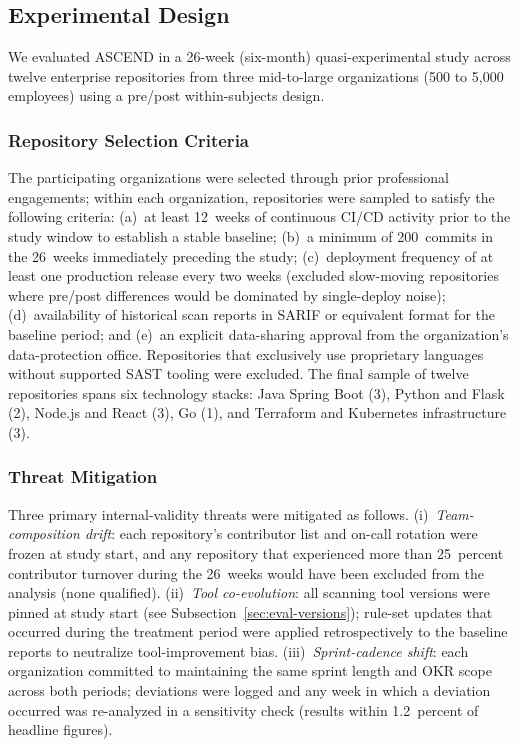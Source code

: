 \documentclass{ieeeaccess}
\begin{document}
\subsection{Experimental Design}
We evaluated ASCEND in a 26-week (six-month) quasi-experimental study across twelve enterprise repositories from three mid-to-large organizations (500 to 5{,}000 employees) using a pre/post within-subjects design.

\subsubsection{Repository Selection Criteria}
The participating organizations were selected through prior professional engagements; within each organization, repositories were sampled to satisfy the following criteria: (a)~at least 12~weeks of continuous CI/CD activity prior to the study window to establish a stable baseline; (b)~a minimum of 200~commits in the 26~weeks immediately preceding the study; (c)~deployment frequency of at least one production release every two weeks (excluded slow-moving repositories where pre/post differences would be dominated by single-deploy noise); (d)~availability of historical scan reports in SARIF or equivalent format for the baseline period; and (e)~an explicit data-sharing approval from the organization's data-protection office. Repositories that exclusively use proprietary languages without supported SAST tooling were excluded. The final sample of twelve repositories spans six technology stacks: Java Spring Boot (3), Python and Flask (2), Node.js and React (3), Go (1), and Terraform and Kubernetes infrastructure (3).

\subsubsection{Threat Mitigation}
Three primary internal-validity threats were mitigated as follows. (i)~\textit{Team-composition drift}: each repository's contributor list and on-call rotation were frozen at study start, and any repository that experienced more than 25~percent contributor turnover during the 26~weeks would have been excluded from the analysis (none qualified). (ii)~\textit{Tool co-evolution}: all scanning tool versions were pinned at study start (see Subsection~\ref{sec:eval-versions}); rule-set updates that occurred during the treatment period were applied retrospectively to the baseline reports to neutralize tool-improvement bias. (iii)~\textit{Sprint-cadence shift}: each organization committed to maintaining the same sprint length and OKR scope across both periods; deviations were logged and any week in which a deviation occurred was re-analyzed in a sensitivity check (results within 1.2~percent of headline figures).
\end{document}
